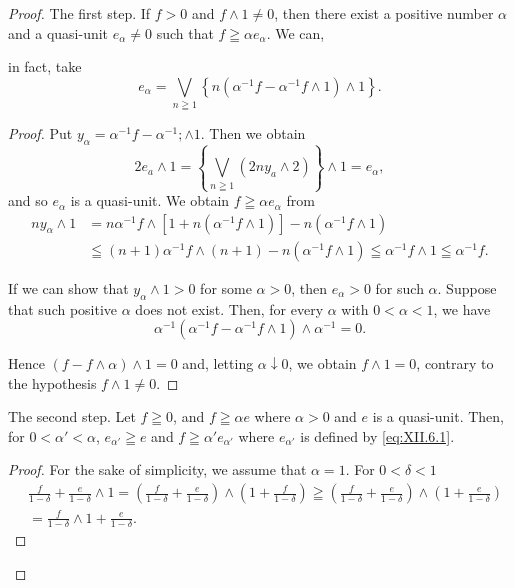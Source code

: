 \begin{proof}
 The first step. If $f > 0$ and $f \wedge 1 \neq 0$, then there exist a positive number $\alpha$ and a quasi-unit $e_{\alpha} \neq 0$ such that $f \geqq \alpha e_{\alpha}$. We can, 

in fact, take 
\begin{equation}\label{eq:XII.6.1}
e _{\alpha} = \bigvee\limits_{n \geqq 1} \left\{n \left(\alpha^{-1} f - \alpha^{-1} f \wedge 1\right) \wedge 1 \right\}. \end{equation}


\begin{proof}
 Put $y_{\alpha} = \alpha^{-1}f - \alpha^{-1}; \wedge 1$. Then we obtain 
\[
2 e _{a} \wedge 1 = \left\{\bigvee\limits_{n \geqq 1} (2 n y _{a} \wedge 2) \right\} \wedge 1 = e _{\alpha},
\]
and so $e_{\alpha}$ is a quasi-unit. We obtain $f \geqq \alpha e_{\alpha}$ from 
\[ \begin{aligned} n y _{\alpha} \wedge 1 & = n \alpha^{-1} f \wedge [ 1 + n (\alpha^{-1} f \wedge 1) ] - n (\alpha^{-1} f \wedge 1) \\ & \leqq (n + 1) \alpha^{-1} f \wedge (n + 1) - n (\alpha^{-1} f \wedge 1) \leqq \alpha^{-1} f \wedge 1 \leqq \alpha^{-1} f. \end{aligned}
\]

If we can show that $y_{\alpha} \wedge 1 > 0$ for some $\alpha > 0$, then $e_{\alpha} > 0$ for such $\alpha$. Suppose that such positive $\alpha$ does not exist. Then, for every $\alpha$ with $0 < \alpha < 1$, we have 
\[
\alpha^{-1} (\alpha^{-1} f - \alpha^{-1} f \wedge 1) \wedge \alpha^{-1} = 0.
\]

Hence $(f - f \wedge \alpha) \wedge 1 = 0$ and, letting $\alpha \downarrow 0$, we obtain $f \wedge 1 = 0$, contrary to the hypothesis $f \wedge 1 \neq 0$. 
\end{proof}

The second step. Let $f \geqq 0$, and $f \geqq \alpha e$ where $\alpha > 0$ and $e$ is a quasi-unit. Then, for $0 < \alpha' < \alpha$, $e_{\alpha'} \geqq e$ and $f \geqq \alpha' e_{\alpha'}$ where $e_{\alpha'}$ is defined by \eqref{eq:XII.6.1}. 

\begin{proof}
 For the sake of simplicity, we assume that $\alpha = 1$. For $0 < \delta < 1$ 
\[ \begin{aligned}
&\frac {f}{1 - \delta} + \frac {e}{1 - \delta} \wedge 1  = \left(\frac {f}{1 - \delta} + \frac {e}{1 - \delta}\right) \wedge \left(1 + \frac {f}{1 - \delta}\right) \geqq \left(\frac {f}{1 - \delta} + \frac {e}{1 - \delta}\right) \wedge \left(1 + \frac {e}{1 - \delta}\right) \\
&= \frac {f}{1 - \delta} \wedge 1 + \frac {e}{1 - \delta}.
\end{aligned}
\]


\end{proof}
\end{proof}
